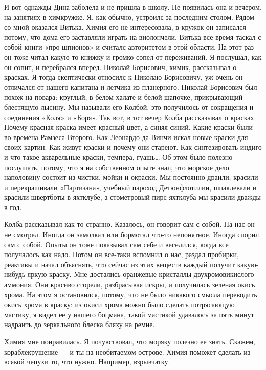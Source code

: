 И вот  однажды Дина  заболела и  не пришла  в школу.  Не появилась  она  и
вечером, на занятиях  в химкружке.  Я, как обычно,  устроилс за  последним
столом. Рядом со мной оказался Витька. Химия его не интересовала, в кружок
он записался потому, что дома его заставляли играть на виолончели.  Витька
все время таскал с собой книги «про шпионов» и считалс авторитетом в  этой
области. На  этот раз  он тоже  читал какую-то  книжку и  громко сопел  от
переживаний. Я  послушал,  как  он сопит,  и  перебрался  вперед.  Николай
Борисович, химик, рассказывал  о красках. Я  тогда скептически относилс  к
Николаю Борисовичу, уж очень он отличался от нашего капитана и летчика  из
планерного. Николай Борисович был похож на повара: круглый, в белом халате
и белой шапочке,  прикрывающий блестящую лысину.  Мы называли его  Колбой,
это получилось от сокращения и соединения «Коля» и «Боря». Так вот, в  тот
вечер Колба рассказывал  о красках.  Почему красная  краска имеет  красный
цвет, а синяя  синий. Какие краски  были во времена  Рамзеса Второго.  Как
Леонардо да Винчи искал новые краски для своих картин. Как живут краски  и
почему они  стареют.  Как синтезировать  индиго  и что  такое  акварельные
краски, темпера, гуашь… Об этом было  полезно послушать, потому, что я  на
собственном опыте знал,  что морское  дело наполовину  состоит из  чистки,
мойки и окраски. Мы постоянно драили, красили и перекрашивали «Партизана»,
учебный пароход Детюнфлотилии, шпаклевали и красили швертботы в  яхтклубе,
а стометровый пирс яхтклуба мы красили дважды в год.

Колба рассказывал как-то странно. Казалось, он говорит сам с собой. На нас
он не смотрел. Иногда он  замолкал или бормотал что-то непонятное.  Иногда
спорил сам с собой.  Опыты он тоже показывал  сам себе и веселился,  когда
все получалось  как  надо.  Потом  он  все-таки  вспомнил  о  нас,  раздал
пробирки, реактивы и начал  объяснять, что сейчас  из этих веществ  каждый
получит какую-нибудь  яркую  краску.  Мне  достались  оранжевые  кристаллы
двухромовикислого аммония.  Они  красиво  сгорели,  разбрасывая  искры,  и
получилась зеленая окись хрома. На этом я остановился, потому, что не было
никакого смысла переводить окись хрома в краску: из окиси хрома можно было
сделать потрясающую мастику, я видел  ее у нашего боцмана, такой  мастикой
удавалось за пять минут надраить до зеркального блеска бляху на ремне.

Химия мне  понравилась.  Я  почувствовал, что  моряку  полезно  ее  знать.
Скажем, кораблекрушение  —  и ты  на  необитаемом острове.  Химия  поможет
сделать из всякой чепухи то, что нужно. Например, взрывчатку.

